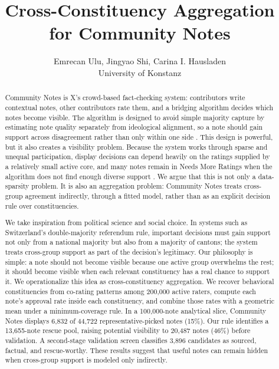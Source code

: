 \documentclass[10pt,twocolumn]{article}
\title{\textbf{Cross-Constituency Aggregation for Community Notes}}
\author{
Emrecan Ulu, Jingyao Shi, Carina I. Hausladen\\
University of Konstanz
}
\date{}
\begin{document}
\maketitle

\begin{abstract}
Community Notes is X's crowd-based fact-checking system: contributors write
contextual notes, other contributors rate them, and a bridging algorithm decides
which notes become visible. The algorithm is designed to avoid simple majority
capture by estimating note quality separately from ideological alignment, so a
note should gain support across disagreement rather than only within one side
\citep{wojcik2022birdwatch,xcommunitynotes2026ranking}. This design is powerful,
but it also creates a visibility problem. Because the system works through
sparse and unequal participation, display decisions can depend heavily on the
ratings supplied by a relatively small active core, and many notes remain in
Needs More Ratings when the algorithm does not find enough diverse support
\citep{goyal2026qsmf,razuvayevskaya2025timeliness}. We argue that this is not
only a data-sparsity problem. It is also an aggregation problem: Community Notes
treats cross-group agreement indirectly, through a fitted model, rather than as
an explicit decision rule over constituencies.

We take inspiration from political science and social choice. In systems such
as Switzerland's double-majority referendum rule, important decisions must gain
support not only from a national majority but also from a majority of cantons;
the system treats cross-group support as part of the decision's legitimacy. Our
philosophy is simple: a note should not become visible because one active group
overwhelms the rest; it should become visible when each relevant constituency
has a real chance to support it. We operationalize this idea as
cross-constituency aggregation. We recover behavioral constituencies from
co-rating patterns among 200,000 active raters, compute each note's approval
rate inside each constituency, and combine those rates with a geometric mean
under a minimum-coverage rule. In a 100,000-note analytical slice, Community
Notes displays 6,832 of 44,722 representative-picked notes (15\%). Our rule
identifies a 13,655-note rescue pool, raising potential visibility to 20,487
notes (46\%) before validation. A second-stage validation screen classifies
3,896 candidates as sourced, factual, and rescue-worthy. These results suggest
that useful notes can remain hidden when cross-group support is modeled only
indirectly.
\end{abstract}
\end{document}
